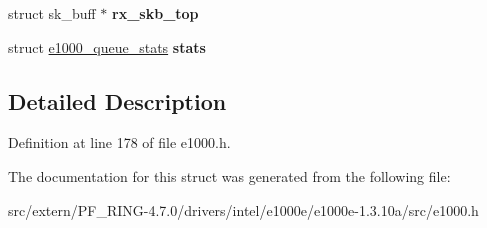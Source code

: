 \begin{DoxyCompactItemize}
\item 
\hypertarget{structe1000__ring_a53474f15e0a8990b5027eabe46fbede0}{
struct sk\_\-buff $\ast$ {\bfseries rx\_\-skb\_\-top}}
\label{structe1000__ring_a53474f15e0a8990b5027eabe46fbede0}

\item 
\hypertarget{structe1000__ring_a999bb15a3092fde325b2b4fc77aab102}{
struct \hyperlink{structe1000__queue__stats}{e1000\_\-queue\_\-stats} {\bfseries stats}}
\label{structe1000__ring_a999bb15a3092fde325b2b4fc77aab102}

\end{DoxyCompactItemize}


\subsection{Detailed Description}


Definition at line 178 of file e1000.h.



The documentation for this struct was generated from the following file:\begin{DoxyCompactItemize}
\item 
src/extern/PF\_\-RING-\/4.7.0/drivers/intel/e1000e/e1000e-\/1.3.10a/src/e1000.h\end{DoxyCompactItemize}
